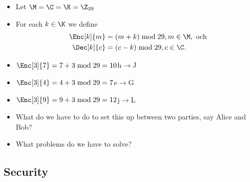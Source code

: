 \begin{frame}
  \begin{definition}\label{ShiftCipher}
    \begin{itemize}
      \item Let \(\M = \C = \K = \Z_{29}\)
      \item For each \(k\in \K\) we define
        \begin{align}
          \nonumber
          \Enc[k]{m} &= (m + k) \bmod 29, m\in \M, \text{\ och } \\
          \nonumber
          \Dec[k]{c} &= (c - k) \bmod 29, c\in \C.
        \end{align}
    \end{itemize}
  \end{definition}

  \pause{}

  \begin{example}
    \begin{itemize}
      \item \(\Enc[3]{7} = 7+3 \bmod 29 = 10\)\hfill h\(\to\)J
      \item \(\Enc[3]{4} = 4+3 \bmod 29 = 7\)\hfill e\(\to\)G
      \item \(\Enc[3]{9} = 9+3 \bmod 29 = 12\)\hfill j\(\to\)L
    \end{itemize}
  \end{example}
\end{frame}

\begin{frame}
  \begin{exercise}
    \begin{itemize}
      \item What do we have to do to set this up between two parties, say Alice 
        and Bob?
      \item What problems do we have to solve?
    \end{itemize}
  \end{exercise}
\end{frame}

\subsection{Security}

